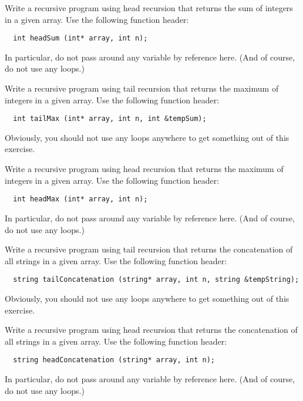 \begin{exercise}
  Write a recursive program using head recursion
  that returns the sum of integers in a given array.
  Use the following function header:

\begin{verbatim}
  int headSum (int* array, int n);
\end{verbatim}

  In particular, do not pass around any variable by reference here.
  (And of course, do not use any loops.)
\end{exercise}

\begin{exercise}
  Write a recursive program using tail recursion
  that returns the maximum of integers in a given array.
  Use the following function header:

\begin{verbatim}
  int tailMax (int* array, int n, int &tempSum);
\end{verbatim}
  Obviously, you should not use any loops anywhere to get something
  out of this exercise.
\end{exercise}

\begin{exercise}
  Write a recursive program using head recursion
  that returns the maximum of integers in a given array.
  Use the following function header:

\begin{verbatim}
  int headMax (int* array, int n);
\end{verbatim}

  In particular, do not pass around any variable by reference here.
  (And of course, do not use any loops.)
\end{exercise}

\begin{exercise}
  Write a recursive program using tail recursion
  that returns the concatenation of all strings in a given array.
  Use the following function header:

\begin{verbatim}
  string tailConcatenation (string* array, int n, string &tempString);
\end{verbatim}
  Obviously, you should not use any loops anywhere to get something
  out of this exercise.
\end{exercise}

\begin{exercise}
  Write a recursive program using head recursion
  that returns the concatenation of all strings in a given array.
  Use the following function header:

\begin{verbatim}
  string headConcatenation (string* array, int n);
\end{verbatim}

  In particular, do not pass around any variable by reference here.
  (And of course, do not use any loops.)
\end{exercise}


